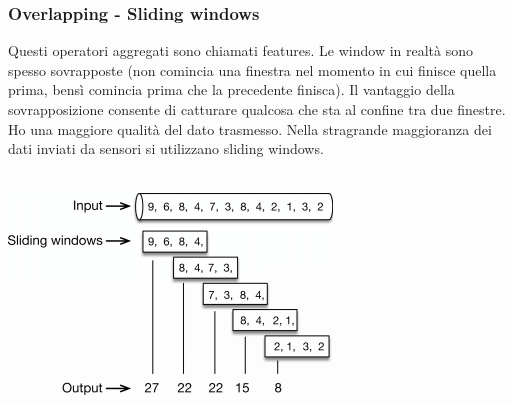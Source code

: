 \subsubsection{Overlapping - Sliding windows}
Questi operatori aggregati sono chiamati features. Le window in realtà sono spesso sovrapposte (non comincia una finestra nel momento in cui finisce quella prima, bensì comincia prima che la precedente finisca). Il vantaggio della sovrapposizione consente di catturare qualcosa che sta al confine tra due finestre. Ho una maggiore qualità del dato trasmesso. Nella stragrande maggioranza dei dati inviati da sensori si utilizzano sliding windows.
\\
\\
\begin{center}
    \includegraphics[width = .7\textwidth]{images/lezione9/sliding_windows.png}
\end{center}
\phantom \\






